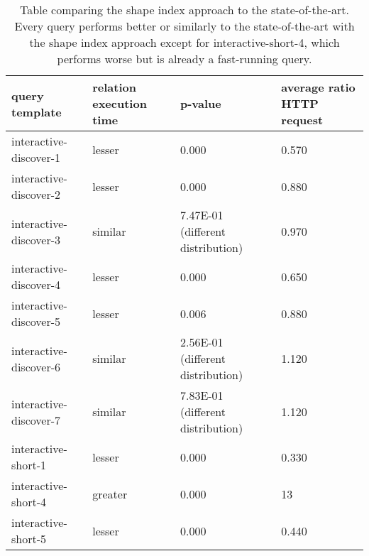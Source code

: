\begin{table}
	\begin{center}
		\begin{tabular}{|l|l|l|l|}
			\hline
			query template & relation execution time & p-value & average ratio HTTP request \\
			\hline
			interactive-discover-1 & lesser & 0.000 & 0.570 \\
			\hline
			interactive-discover-2 & lesser & 0.000 & 0.880 \\
			\hline
			interactive-discover-3 & similar & 7.47E-01 (different distribution) & 0.970 \\
			\hline
			interactive-discover-4 & lesser & 0.000 & 0.650 \\
			\hline
			interactive-discover-5 & lesser & 0.006 & 0.880 \\
			\hline
			interactive-discover-6 & similar & 2.56E-01 (different distribution) & 1.120 \\
			\hline
			interactive-discover-7 & similar & 7.83E-01 (different distribution) & 1.120 \\
			\hline
			interactive-short-1 & lesser & 0.000 & 0.330 \\
			\hline
			interactive-short-4 & greater & 0.000 & 13 \\
			\hline
			interactive-short-5 & lesser & 0.000 & 0.440 \\
			\hline
		\end{tabular}
	\end{center}
	\caption{Table comparing the shape index approach to the state-of-the-art. Every query performs better or similarly to the state-of-the-art with the shape index approach except for interactive-short-4, which performs worse but is already a fast-running query.}
	\label{tab:statSignificanceStateOfTheArt}
\end{table}